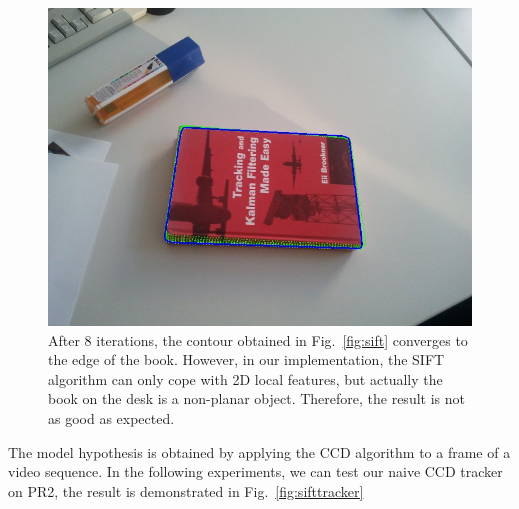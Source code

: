 \begin{figure}[htbp]
  \centering
\includegraphics[width=\linewidth]{images/sift_result.jpg}
\caption[The contour obtained using the CCD algorithm converges to the
edge of the book]{After 8 iterations, the contour obtained in Fig.~\ref{fig:sift} converges to the edge of the book. However, in our
  implementation, the SIFT algorithm can only cope with 2D
  local features, but actually the book on the desk is a non-planar
  object. Therefore, the result is not as good as expected.}
\label{fig:sift_result}
\end{figure}

The model hypothesis is obtained by applying the CCD algorithm to a
frame of a video sequence. In the following experiments, we can test
our naive CCD tracker on PR2, the result is demonstrated in Fig.~\ref{fig:sifttracker} 

